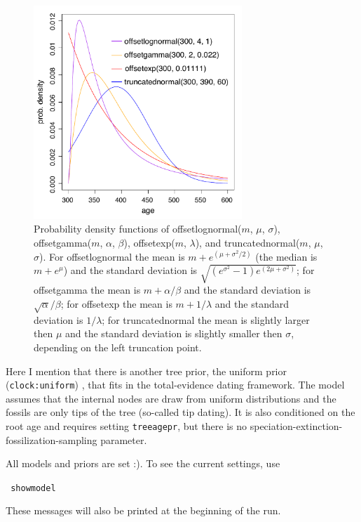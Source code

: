 \documentclass[12pt]{article}
\begin{document}
\begin{figure}[p]
\includegraphics[width=0.7\textwidth]{figures/treeage.pdf}
\caption{Probability density functions of offsetlognormal($m$, $\mu$, $\sigma$), offsetgamma($m$, $\alpha$, $\beta$), offsetexp($m$, $\lambda$), and truncatednormal($m$, $\mu$, $\sigma$).
For offsetlognormal the mean is $m + e^{(\mu + \sigma^2/2)}$ (the median is $m + e^{\mu}$) and the standard deviation is $\sqrt{(e^{\sigma^2} -1) e^{(2\mu + \sigma^2)}}$;
for offsetgamma the mean is $m + \alpha/\beta$ and the standard deviation is $\sqrt{\alpha}/\beta$;
for offsetexp the mean is $m + 1/\lambda$ and the standard deviation is $1/\lambda$;
for truncatednormal the mean is slightly larger then $\mu$ and the standard deviation is slightly smaller then $\sigma$, depending on the left truncation point.
}
\label{fig_treeage}
\end{figure}

Here I mention that there is another tree prior, the uniform prior \\
({\tt clock:uniform}) \citep{Ronquist:2012ea}, that fits in the total-evidence dating framework.
The model assumes that the internal nodes are draw from uniform distributions and the fossils are only tips of the tree (so-called tip dating). 
It is also conditioned on the root age and requires setting {\tt treeagepr}, but there is no speciation-extinction-fossilization-sampling parameter.

All models and priors are set :). To see the current settings, use

\medskip
{\tt \color{red} \noindent
showmodel
}
\medskip

\noindent These messages will also be printed at the beginning of the run.
\end{document}
